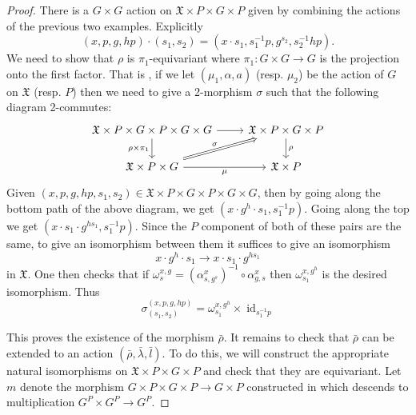 \documentclass[10pt,a4paper]{amsart}
\newcommand{\fX}{{\mathfrak X}}
\DeclareMathOperator{\id}{id}
\begin{document}
\begin{proof}
    There is a $G\times G$ action on $\fX\times P \times  G\times P$ given by combining the actions of the previous two examples. Explicitly
    $$
    (x,p, g, hp)\cdot (s_{1},s_{2}) = (x\cdot s_{1}, s_{1}^{-1}p,g^{s_{2}}, s_{2}^{-1}hp). 
    $$
    We need to show that $\rho$ is $\pi_1$-equivariant where $\pi_1:G\times G\to G$ is the 
    projection onto the first factor. That is , if we let $(\mu_{1},\alpha,a)$ 
    (resp. $\mu_{2}$) be the action of $G$ on $\fX$ (resp. $P$) then we need to give a 
    2-morphism $\sigma$ such that the following diagram 2-commutes:
    $$
    \begin{tikzcd}
        {\fX\times P\times G \times P \times G \times G} & {\fX\times P \times G \times P} \\
        {\fX\times P \times G} & {\fX\times P}
        \arrow[from=1-1, to=1-2]
        \arrow["{\rho\times\pi_1}"', from=1-1, to=2-1]
        \arrow["\rho", from=1-2, to=2-2]
        \arrow["\sigma", Rightarrow, from=2-1, to=1-2]
        \arrow["\mu"', from=2-1, to=2-2]
    \end{tikzcd}
    $$
    Given $(x,p,g,hp,s_1,s_2) \in \fX\times P \times G \times P \times G \times G$,
    then by going along the bottom path of the above diagram, we get 
    $(x\cdot g^{h} \cdot s_{1},s_{1}^{-1}p)$. Going along the top we get
    $(x\cdot s_{1}\cdot g^{hs_1}, s_{1}^{-1}p)$. Since the $P$ component of
    both of these pairs are the same, to give an isomorphism between them it suffices 
    to give an isomorphism 
    $$x\cdot g^{h}\cdot s_{1} \to x\cdot s_{1}\cdot g^{hs_1}$$
    in $\fX$. One then checks that if 
    $\omega_{s}^{x,g} = (\alpha_{s,g^{s}}^{x})^{-1} \circ \alpha_{g,s}^{x}$
    then $\omega_{s_{1}}^{x,g^{h}}$ is the desired isomorphism. Thus 
    $$\sigma_{(s_1,s_2)}^{(x,p,g,hp)} = \omega_{s_{1}}^{x,g^{h}} \times \id_{s_{1}^{-1}p}$$
    
    This proves the existence of the morphism $\bar{\rho}$. It remains to check that 
    $\bar{\rho}$ can be extended to an action $(\bar{\rho}, \bar{\lambda}, \bar{l})$. 
    To do this, we will construct the appropriate natural isomorphisms on 
    $\fX \times P \times G\times P$ and check that they are equivariant. Let $m$
    denote the morphism $G \times P \times G \times P \to G \times P$
    constructed in  which descends to multiplication 
    $G^{P} \times G^{P} \to G^{P}$.


\end{proof}
\end{document}
